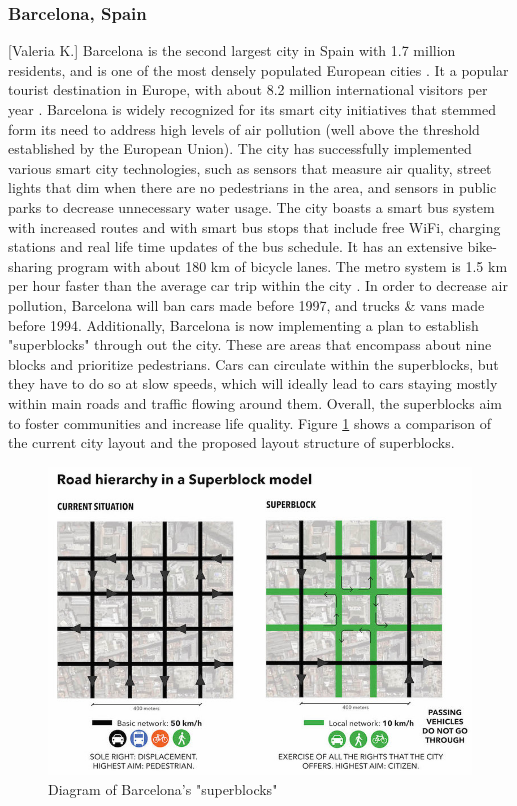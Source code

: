 \documentclass[12pt]{article}                               %
\begin{document}
\subsubsection{Barcelona, Spain}[Valeria K.]
Barcelona is the second largest city in Spain with 1.7 million residents, and is one of the most densely populated European cities \cite{Bausells2016SuperblocksResidents}. It a popular tourist destination in Europe, with about 8.2 million international visitors per year \cite{Bausells2016SuperblocksResidents}. Barcelona is widely recognized for its smart city initiatives that stemmed form its need to address high levels of air pollution (well above the threshold established by the European Union). The city has successfully implemented various smart city technologies, such as sensors that measure air quality, street lights that dim when there are no pedestrians in the area, and sensors in public parks to decrease unnecessary water usage. The city boasts a smart bus system with increased routes and with smart bus stops that include free WiFi, charging stations and real life time updates of the bus schedule. It has an extensive bike-sharing program with about 180 km of bicycle lanes. The metro system is 1.5 km per hour faster than the average car trip within the city \cite{Bausells2016SuperblocksResidents}. In order to decrease air pollution, Barcelona will ban cars made before 1997, and trucks \& vans made before 1994. Additionally, Barcelona is now implementing a plan to establish "superblocks" through out the city. These are areas that encompass about nine blocks and prioritize pedestrians. Cars can circulate within the superblocks, but they have to do so at slow speeds, which will ideally lead to cars staying mostly within main roads and traffic flowing around them. Overall, the superblocks aim to foster communities and increase life quality. Figure \ref{img:barcelona_superblock} shows a comparison of the current city layout and the proposed layout structure of superblocks.

\begin{figure}[H]
    \centering
    \includegraphics[width=0.85\columnwidth]{images/barcelona_superblock.jpg}
    \caption{Diagram of Barcelona's "superblocks"}
    \label{img:barcelona_superblock}
\end{figure}
\end{document}
